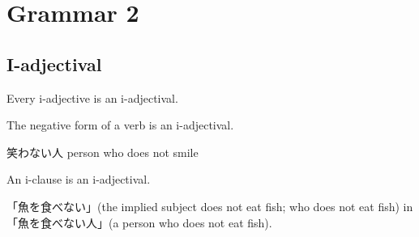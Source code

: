 \chapter{Grammar 2}

\section{I-adjectival}

Every i-adjective is an i-adjectival.

The negative form of a verb is an i-adjectival.

笑わない人 person who does not smile

An i-clause is an i-adjectival.

「魚を食べない」(the implied subject does not eat fish; who does not eat fish) in「魚を食べない人」(a person who does not eat fish).
